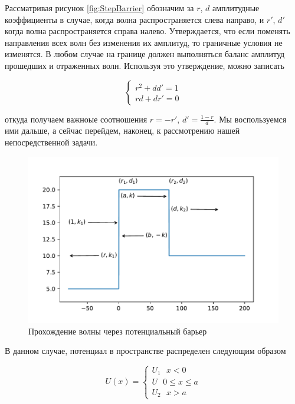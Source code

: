 \documentclass[a4paper, 12pt]{article}
\begin{document}
    Рассматривая рисунок \ref{fig:StepBarrier} обозначим за $r$, $d$ амплитудные коэффициенты в случае, когда волна 
    распространяется слева направо, и $r'$, $d'$ когда волна распространяется справа налево.
    Утверждается, что если поменять направления всех волн без изменения их амплитуд, то граничные условия не изменятся.
    В любом случае на границе должен выполняться баланс амплитуд прошедших и отраженных волн. Используя это утверждение,
    можно записать

    \begin{equation} \label{eq:r'd'}
        \begin{cases}
            r^2 + dd' = 1 \\
            rd + dr' = 0
        \end{cases}
    \end{equation}

    откуда получаем важноые соотношения $r = -r'$, $\displaystyle d' = \frac{1 - r}{d}$. 
    Мы воспользуемся ими дальше, а сейчас перейдем, наконец, к рассмотрению
    нашей непосредственной задачи.

    \begin{figure}
        \centering
        \includegraphics{images/PotentialBarrier.pdf}
        \caption{Прохождение волны через потенциальный барьер}
        \label{fig:PotentialBarrier}
    \end{figure}

    В данном случае, потенциал в пространстве распределен следующим образом

    \begin{equation}
        U(x) = 
        \begin{cases}
            U_1 ~~~ x < 0 \\
            U ~~~ 0 \leq x \leq a \\
            U_2 ~~~ x > a
        \end{cases}
    \end{equation}
\end{document}
